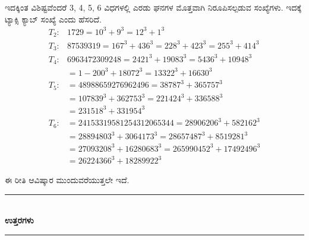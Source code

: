 \begin{enumerate}
ಇದಕ್ಕಿಂತ ವಿಶಿಷ್ಟವೆಂದರೆ 3, 4, 5, 6 ವಿಧಗಳಲ್ಲಿ ಎರಡು ಘನಗಳ ಮೊತ್ತವಾಗಿ ನಿರೂಪಿಸಲ್ಪಡುವ ಸಂಖ್ಯೆಗಳು. ಇದಕ್ಕೆ ಟ್ಯಾಕ್ಸಿ ಕ್ಯಾಬ್ ಸಂಖ್ಯೆ ಎಂದು ಹೆಸರಿದೆ.
\begin{align*}
T_{2} : & 1729 = 10^{3} + 9^{3} = 12^{3} + 1^{3}\\
T_{3} : & 87539319 = 167^{3} + 436^{3} = 228^{3} + 423^{3} = 255^{3} + 414^{3}\\
T_{4} : & 6963472309248 = 2421^{3} + 19083^{3} = 5436^{3} + 10948^{3}\\
& = 1-200^{3} + 18072^{3} = 13322^{3} + 16630^{3}\\
T_{5} : & = 48988659276962496 = 38787^{3} + 365757^{3}\\ 
& = 107839^{3} + 362753^{3} = 221424^{3} + 336588^{3}\\
& = 231518^{3} + 331954^{3}\\
T_{6} : & = 24153319581254312065344= 28906206^{3} + 582162^{3}\\
& = 28894803^{3} + 3064173^{3} = 28657487^{3} + 8519281^{3}\\
& = 27093208^{3} + 16280683^{3} = 265990452^{3} + 17492496^{3}\\
& = 26224366^{3} + 18289922^{3}
\end{align*}

ಈ ರೀತಿ ಆವಿಷ್ಕಾರ ಮುಂದುವರೆಯುತ್ತಲೇ ಇದೆ. 
\end{enumerate}

\smallskip

\begin{center}
\rule{5cm}{1pt}\\[3pt]
{\Large\bfseries ಉತ್ತರಗಳು}\\[-0.1cm]
\rule{5cm}{1pt}
\end{center}

